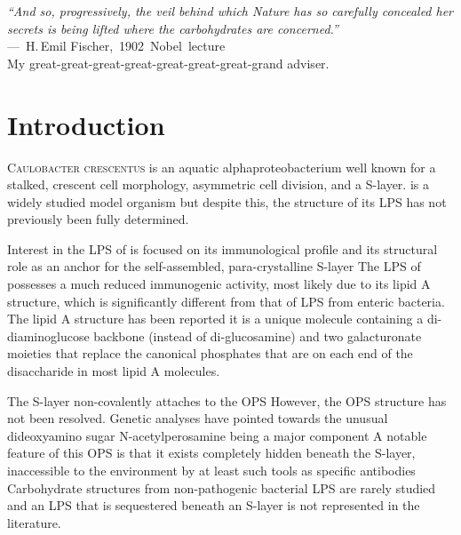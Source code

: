 \acresetall
{}

\begin{epigraph}
  \emph{``And so, progressively, the veil behind which Nature has so carefully concealed her secrets
is being lifted where the carbohydrates are concerned.''} \\---~H.\,Emil Fischer,~1902~Nobel~lecture\\ My great-great-great-great-great-great-great-grand adviser.
\end{epigraph}
\section{Introduction} %
\label{sec:lps_introduction} 
\lettrine[lines=2]{C}{aulobacter crescentus}  is an aquatic alphaproteobacterium
well known for a stalked, crescent cell morphology, asymmetric cell division, and a
\ac{S-layer}. \caulobacter is a widely studied model organism but despite this, the structure of its \ac{LPS} has not previously been fully
determined.

Interest in the \ac{LPS} of \caulobacter is focused on its immunological
profile and its structural role as an anchor for the
self-assembled, para-crystalline \ac{S-layer} The \ac{LPS}
of \caulobacter possesses a much reduced immunogenic activity, most likely due
to its lipid A structure, which is significantly different from that of
\ac{LPS} from enteric bacteria. The lipid A structure has been
reported it is a unique molecule containing a
di-diaminoglucose backbone (instead of di-glucosamine) and two galacturonate
moieties that replace the canonical phosphates that are on each end of the
disaccharide in most lipid A molecules. 

The \caulobacter \ac{S-layer}
non-covalently attaches to the \ac{OPS} However, the
\ac{OPS} structure has not been resolved. Genetic analyses have pointed
towards the unusual dideoxyamino sugar N-acetylperosamine being a major
component A notable feature of this \ac{OPS} is that it
exists completely hidden beneath the \ac{S-layer}, inaccessible to the
environment by at least such tools as specific antibodies Carbohydrate structures from non-pathogenic
bacterial \ac{LPS} are rarely studied and an \ac{LPS} that is sequestered
beneath an \ac{S-layer} is not represented in the literature.
 
